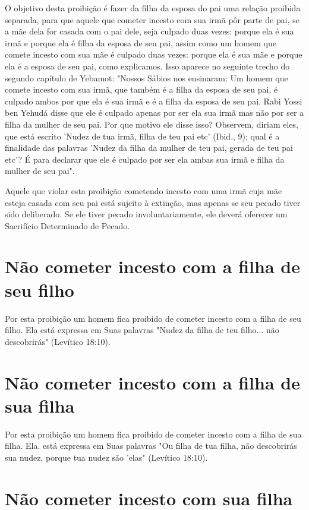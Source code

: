 O objetivo desta proibição é fazer da filha da esposa do pai uma
re­lação proibida separada, para que aquele que cometer incesto com sua
irmã pôr parte de pai, se a mãe dela for casada com o pai dele, seja
culpado duas vezes: porque ela é sua irmã e porque ela é filha da esposa
de seu pai, assim como um homem que comete incesto com sua mãe é culpado
duas vezes: porque ela é sua mãe e porque ela é a esposa de seu pai,
como explicamos. Isso aparece no seguinte trecho do segundo capítulo de
Yebamot: "Nossos Sábios nos ensi­naram: Um homem que comete incesto com
sua irmã, que também é a filha da esposa de seu pai, é culpado ambos por
que ela é sua irmã e é a filha da esposa de seu pai. Rabi Yossi ben
Yehudá disse que ele é culpado apenas por ser ela sua irmã mas não por
ser a filha da mulher de seu pai. Por que motivo ele disse isso?
Observem, diriam eles, que está escrito 'Nudez de tua irmã, filha de teu
pai etc' (Ibid., 9); qual é a finalidade das palavras 'Nudez da filha da
mu­lher de teu pai, gerada de teu pai etc'? É para declarar que ele é
culpado por ser ela ambas sua irmã e filha da mulher de seu pai".

Aquele que violar esta proibição cometendo incesto com uma irmã cuja mãe
esteja casada com seu pai está sujeito à extinção, mas apenas se seu
pecado tiver sido deliberado. Se ele tiver pecado involuntariamente, ele
deve­rá oferecer um Sacrifício Determinado de Pecado.

\section{Não cometer incesto com a filha de seu filho}

Por esta proibição um homem fica proibido de cometer incesto com a filha
de seu filho. Ela está expressa em Suas palavras "Nudez da filha de teu
filho... não descobrirás" (Levítico 18:10).


\section{Não cometer incesto com a filha de sua filha}

Por esta proibição um homem fica proibido de cometer incesto com a filha
de sua filha. Ela. está expressa em Suas palavras "Ou filha de tua
filha, não descobrirás sua nudez, porque tua nudez são 'elas" (Levítico
18:10).

\section{Não cometer incesto com sua filha}

